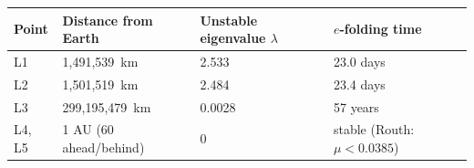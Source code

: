 \begin{tabular}{llll}
\toprule
Point & Distance from Earth & Unstable eigenvalue $\lambda$ & $e$-folding time \\
\midrule
L1 & 1{,}491{,}539~km & 2.533 & 23.0 days \\
L2 & 1{,}501{,}519~km & 2.484 & 23.4 days \\
L3 & 299{,}195{,}479~km & 0.0028 & 57 years \\
L4, L5 & 1 AU (60\textdegree{} ahead/behind) & 0 & stable (Routh: $\mu < 0.0385$) \\
\bottomrule
\end{tabular}
